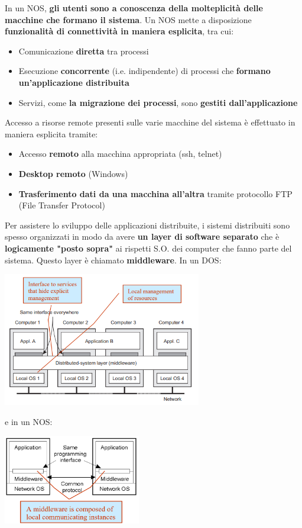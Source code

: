 \documentclass[12pt]{article}
\begin{document}
In un NOS, \textbf{gli utenti sono a conoscenza della molteplicità delle macchine che formano il sistema}. Un NOS mette a disposizione \textbf{funzionalità di connettività in maniera esplicita}, tra cui:
\begin{itemize}
    \item Comunicazione \textbf{diretta} tra processi
    \item Esecuzione \textbf{concorrente} (i.e. indipendente) di processi che \textbf{formano un'applicazione distribuita}
    \item Servizi, come \textbf{la migrazione dei processi}, sono \textbf{gestiti dall'applicazione}
\end{itemize}
Accesso a risorse remote presenti sulle varie macchine del sistema è effettuato in maniera esplicita tramite:
\begin{itemize}
    \item Accesso \textbf{remoto} alla macchina appropriata (ssh, telnet)
    \item \textbf{Desktop remoto} (Windows)
    \item \textbf{Trasferimento dati da una macchina all'altra} tramite protocollo FTP (File Transfer Protocol)
\end{itemize}
Per assistere lo sviluppo delle applicazioni distribuite, i sistemi distribuiti sono spesso organizzati in modo da avere \textbf{un layer di software separato} che è \textbf{logicamente "posto sopra"} ai rispetti S.O. dei computer che fanno parte del sistema. Questo layer è chiamato \textbf{middleware}. In un DOS:
\begin{center}
    \includegraphics[width = 0.65\textwidth]{Images/13.PNG}
\end{center}
e in un NOS:
\begin{center}
    \includegraphics[width = 0.45\textwidth]{Images/14.PNG}
\end{center}
\end{document}
